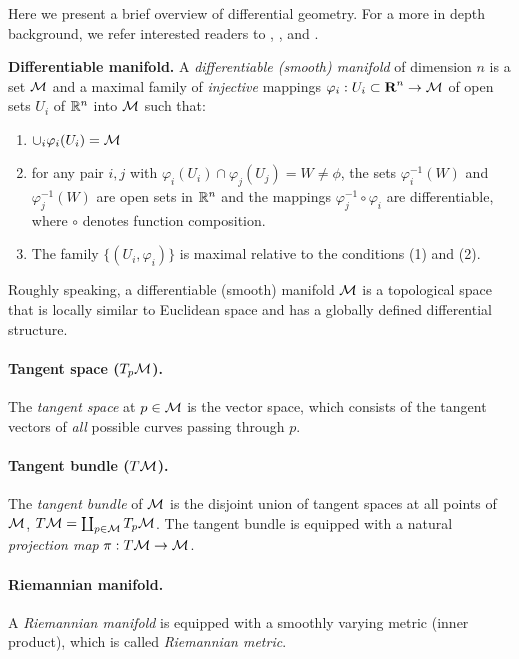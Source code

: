 Here we present a brief overview of differential geometry. For a more in depth background, we refer interested readers to \cite{do1992riemannian}, \cite{lee2003smooth}, and \cite{spivak1981comprehensive}.


\textbf{Differentiable manifold.}
A \textit{differentiable (smooth) manifold} of dimension $n$ is a set $\mathcal{M}$ and a maximal family of \textit{injective} mappings $\varphi_{i}:U_{i}
\subset \textbf{R}^{n} \rightarrow \mathcal{M}$ of open sets $U_{i}$ of
$\mathbb{R}^{n}$ into $\mathcal{M}$ such that:
\begin{enumerate}
\item $\cup_{i}\varphi_{i}(U_{i}) =\mathcal{M}$
\item for any pair $i,j$ with $\varphi_{i} (U_{i}) \cap
\varphi_{j} (U_{j}) = W \neq \phi$, the sets $\varphi_{i}^{-1}(W)$
and $\varphi_{j}^{-1}(W)$ are open sets in $\mathbb{R}^{n}$ and the
mappings $\varphi_{j}^{-1} \circ \varphi_{i}$ are
differentiable, where $\circ$ denotes function composition. 
\item The family $\{(U_{i},\varphi_{i})\}$ is maximal relative to
the conditions (1) and (2). 
\end{enumerate}

Roughly speaking, a differentiable (smooth) manifold $\mathcal{M}$ is a topological
space that is locally similar to Euclidean space and has a globally
defined differential structure. 

\paragraph{Tangent space ($T_{p}\mathcal{M}$).} The \textit{tangent space} at $p \in \mathcal{M}$ is the vector space, which consists of 
the tangent vectors of {\em all} possible curves passing through $p$. 

\paragraph{Tangent bundle ($T\mathcal{M}$).} The \textit{tangent bundle} of $\mathcal{M}$ is the disjoint union of tangent spaces at all points of $\mathcal{M}$, 
$T\mathcal{M} = \coprod_{p \in \mathcal{M}}T_{p}\mathcal{M}$. 
The tangent bundle is equipped with a natural \textit{projection map} $\pi: T\mathcal{M} \rightarrow \mathcal{M}$. 

\paragraph{Riemannian manifold.} A \textit{Riemannian manifold} is 
equipped with a
smoothly varying metric (inner product), which is called \textit{Riemannian metric}. 

